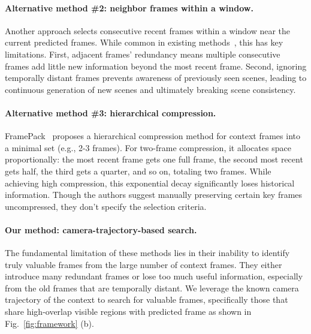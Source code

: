 \paragraph{Alternative method \#2: neighbor frames within a window.} 
Another approach selects consecutive recent frames within a window near the current predicted frames. While common in existing methods~\cite{dfot,oasis,gamefactory}, this has key limitations. First, adjacent frames' redundancy means multiple consecutive frames add little new information beyond the most recent frame. Second, ignoring temporally distant frames prevents awareness of previously seen scenes, leading to continuous generation of new scenes and ultimately breaking scene consistency.


\paragraph{Alternative method \#3: hierarchical compression.} FramePack~\cite{framepack} proposes a hierarchical compression method for context frames into a minimal set (e.g., 2-3 frames). For two-frame compression, it allocates space proportionally: the most recent frame gets one full frame, the second most recent gets half, the third gets a quarter, and so on, totaling two frames. While achieving high compression, this exponential decay significantly loses historical information. Though the authors suggest manually preserving certain key frames uncompressed, they don't specify the selection criteria.

\paragraph{Our method: camera-trajectory-based search.}
The fundamental limitation of these methods lies in their inability to identify truly valuable frames from the large number of context frames. They either introduce many redundant frames or lose too much useful information, especially from the old frames that are temporally distant.
We leverage the known camera trajectory of the context to search for valuable frames, specifically those that share high-overlap visible regions with predicted frame as shown in Fig.~\ref{fig:framework} (b).

